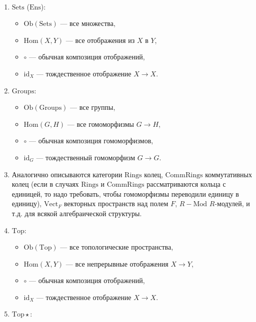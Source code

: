 \documentclass[12pt,a4paper]{article}
\newcommand{\Hom}{\mathrm{Hom}}
\newcommand{\Ob}{\mathrm{Ob}}
\newcommand{\id}{\mathrm{id}}
\newcommand{\Sets}{\mathrm{Sets}}
\newcommand{\Ens}{\mathrm{Ens}}
\newcommand{\Groups}{\mathrm{Groups}}
\newcommand{\Rings}{\mathrm{Rings}}
\newcommand{\CommRings}{\mathrm{CommRings}}
\newcommand{\Vect}{\mathrm{Vect}}
\newcommand{\Mod}{\mathrm{Mod}}
\newcommand{\Top}{\mathrm{Top}}
\newcommand{\Topstar}{\mathrm{Top\star}}
\begin{document}
    \begin{example}\ 
        \begin{enumerate}
            \item $\Sets$ ($\Ens$):
                \begin{itemize}
                    \item $\Ob(\Sets)$ --- все множества,
                    \item $\Hom(X, Y)$ --- все отображения из $X$ в $Y$,
                    \item $\circ$ --- обычная композиция отображений,
                    \item $\id_X$ --- тождественное отображение $X \to X$.
                \end{itemize}
            \item $\Groups$:
                \begin{itemize}
                    \item $\Ob(\Groups)$ --- все группы,
                    \item $\Hom(G, H)$ --- все гомоморфизмы $G \to H$,
                    \item $\circ$ --- обычная композиция гомоморфизмов,
                    \item $\id_G$ --- тождественный гомоморфизм $G \to G$.
                \end{itemize}
            \item Аналогично описываются категории $\Rings$ колец, $\CommRings$ коммутативных колец (если в случаях $\Rings$ и $\CommRings$ рассматриваются кольца с единицей, то надо требовать, чтобы гомоморфизмы переводили единицу в единицу), $\Vect_F$ векторных пространств над полем $F$, $R-\Mod$ $R$-модулей, и т.д. для всякой алгебраической структуры.
            \item $\Top$:
                \begin{itemize}
                    \item $\Ob(\Top)$ --- все топологические пространства,
                    \item $\Hom(X, Y)$ --- все непрерывные отображения $X \to Y$,
                    \item $\circ$ --- обычная композиция отображений,
                    \item $\id_X$ --- тождественное отображение $X \to X$.
                \end{itemize}
            \item $\Topstar$:
                \begin{itemize}

\end{itemize}
\end{enumerate}
\end{example}
\end{document}
